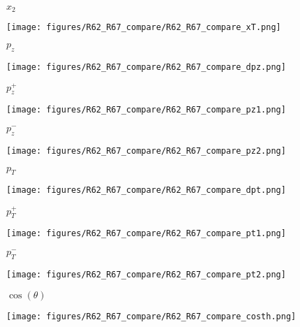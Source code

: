 \documentclass{beamer}
\begin{document}
\begin{frame}{$x_2$}
	\begin{center}
		\texttt{[image: figures/R62\_R67\_compare/R62\_R67\_compare\_xT.png]}
	\end{center}
\end{frame}

\begin{frame}{$p_z$}
	\begin{center}
		\texttt{[image: figures/R62\_R67\_compare/R62\_R67\_compare\_dpz.png]}
	\end{center}
\end{frame}

\begin{frame}{$p_z^+$}
	\begin{center}
		\texttt{[image: figures/R62\_R67\_compare/R62\_R67\_compare\_pz1.png]}
	\end{center}
\end{frame}

\begin{frame}{$p_z^-$}
	\begin{center}
		\texttt{[image: figures/R62\_R67\_compare/R62\_R67\_compare\_pz2.png]}
	\end{center}
\end{frame}

\begin{frame}{$p_T$}
	\begin{center}
		\texttt{[image: figures/R62\_R67\_compare/R62\_R67\_compare\_dpt.png]}
	\end{center}
\end{frame}

\begin{frame}{$p_T^+$}
	\begin{center}
		\texttt{[image: figures/R62\_R67\_compare/R62\_R67\_compare\_pt1.png]}
	\end{center}
\end{frame}

\begin{frame}{$p_T^-$}
	\begin{center}
		\texttt{[image: figures/R62\_R67\_compare/R62\_R67\_compare\_pt2.png]}
	\end{center}
\end{frame}

\begin{frame}{$\cos(\theta)$}
	\begin{center}
		\texttt{[image: figures/R62\_R67\_compare/R62\_R67\_compare\_costh.png]}
	\end{center}
\end{frame}
\end{document}
